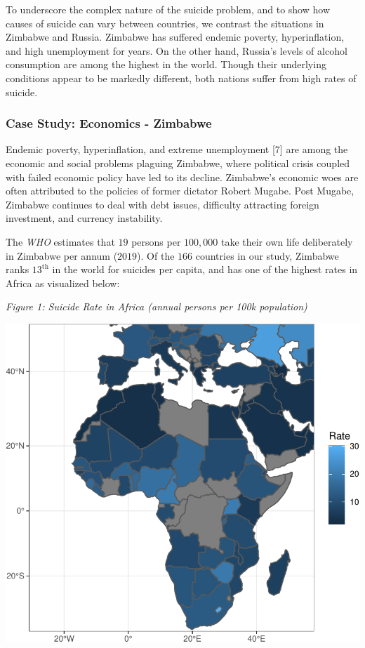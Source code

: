 \documentclass[]{article}
\begin{document}
To underscore the complex nature of the suicide problem, and to show how
causes of suicide can vary between countries, we contrast the situations
in Zimbabwe and Russia. Zimbabwe has suffered endemic poverty,
hyperinflation, and high unemployment for years. On the other hand,
Russia's levels of alcohol consumption are among the highest in the
world. Though their underlying conditions appear to be markedly
different, both nations suffer from high rates of suicide.

\subsubsection{Case Study: Economics -
Zimbabwe}\label{case-study-economics---zimbabwe}

Endemic poverty, hyperinflation, and extreme unemployment {[}7{]} are
among the economic and social problems plaguing Zimbabwe, where
political crisis coupled with failed economic policy have led to its
decline. Zimbabwe's economic woes are often attributed to the policies
of former dictator Robert Mugabe. Post Mugabe, Zimbabwe continues to
deal with debt issues, difficulty attracting foreign investment, and
currency instability.

The \emph{WHO} estimates that \(19\) persons per \(100,000\) take their
own life deliberately in Zimbabwe per annum (\(2019\)). Of the \(166\)
countries in our study, Zimbabwe ranks \(13^{\text{th}}\) in the world
for suicides per capita, and has one of the highest rates in Africa as
visualized below:

\emph{Figure 1: Suicide Rate in Africa (annual persons per 100k
population)}

\begin{center}\includegraphics{Project_Report_files/figure-latex/africa_map_plot-1} \end{center}
\end{document}
